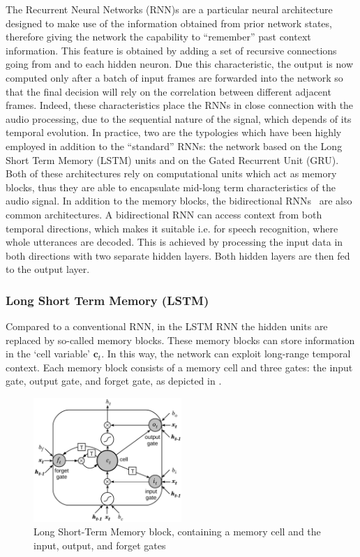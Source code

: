 The Recurrent Neural Networks (RNN)s are a particular neural architecture designed to make use of the information obtained from prior network states, therefore giving the network the capability to ``remember'' past context information. This feature is obtained by adding a set of recursive connections going from and to each hidden neuron. Due this characteristic, the output is now computed only after a batch of input frames are forwarded into the network so that the final decision will rely on the correlation between different adjacent frames. Indeed, these characteristics place the RNNs in close connection with the audio processing, due to the sequential nature of the signal, which depends of its temporal evolution.
In practice, two are the typologies which have been highly employed in addition to the ``standard'' RNNs: the network based on the Long Short Term Memory (LSTM) units and on the Gated Recurrent Unit (GRU). Both of these architectures rely on computational units which act as memory blocks, thus they are able to encapsulate mid-long term characteristics of the audio signal.
In addition to the memory blocks, the bidirectional RNNs~\cite{schuster1997bidirectional} are also common architectures.
A bidirectional RNN can access context from both temporal directions, which makes it suitable i.e. for speech recognition, where whole utterances are decoded. This is achieved by processing the input data in both directions with two separate hidden layers.
Both hidden layers are then fed to the output layer.

\subsubsection{Long Short Term Memory (LSTM)} Compared to a conventional RNN, in the LSTM RNN \cite{Hochreiter97-LST} the hidden units are replaced by so-called memory blocks.
These memory blocks can store information in the `cell variable' $\boldsymbol{c}_t$.
In this way, the network can exploit long-range temporal context.
Each memory block consists of a memory cell and three gates: the input gate, output gate, and forget gate, as depicted in .

\begin{figure}[h]
	\centering
	\includegraphics[width=0.5\textwidth]{img/lstm}
	\caption[LSTM]{Long Short-Term Memory block, containing a memory cell and the input, output, and forget gates}
	\label{fig:lstm}
\end{figure}

